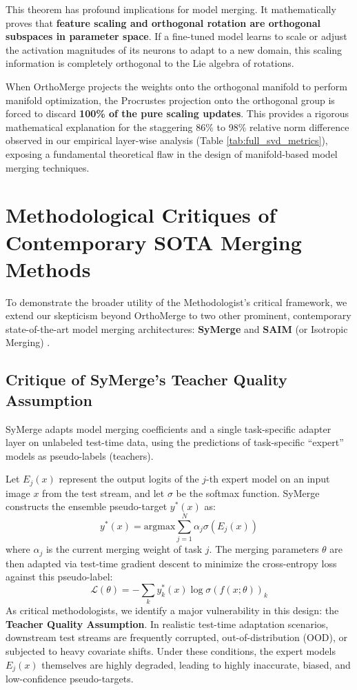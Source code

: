 \documentclass{article}
\begin{document}
This theorem has profound implications for model merging. It mathematically proves that \textbf{feature scaling and orthogonal rotation are orthogonal subspaces in parameter space}. If a fine-tuned model learns to scale or adjust the activation magnitudes of its neurons to adapt to a new domain, this scaling information is completely orthogonal to the Lie algebra of rotations. 

When OrthoMerge projects the weights onto the orthogonal manifold to perform manifold optimization, the Procrustes projection onto the orthogonal group is forced to discard \textbf{100\% of the pure scaling updates}. This provides a rigorous mathematical explanation for the staggering 86\% to 98\% relative norm difference observed in our empirical layer-wise analysis (Table \ref{tab:full_svd_metrics}), exposing a fundamental theoretical flaw in the design of manifold-based model merging techniques.

\section{Methodological Critiques of Contemporary SOTA Merging Methods}
\label{appendix:sota_critiques}
To demonstrate the broader utility of the Methodologist's critical framework, we extend our skepticism beyond OrthoMerge to two other prominent, contemporary state-of-the-art model merging architectures: \textbf{SyMerge} \cite{jung2024symerge} and \textbf{SAIM} (or Isotropic Merging) \cite{marczak2025isotropic}. 

\subsection{Critique of SyMerge's Teacher Quality Assumption}
SyMerge adapts model merging coefficients and a single task-specific adapter layer on unlabeled test-time data, using the predictions of task-specific ``expert'' models as pseudo-labels (teachers). 

Let $E_j(x)$ represent the output logits of the $j$-th expert model on an input image $x$ from the test stream, and let $\sigma$ be the softmax function. SyMerge constructs the ensemble pseudo-target $y^*(x)$ as:
\begin{equation}
    y^*(x) = \text{argmax} \sum_{j=1}^N \alpha_j \sigma\left(E_j(x)\right)
\end{equation}
where $\alpha_j$ is the current merging weight of task $j$. The merging parameters $\theta$ are then adapted via test-time gradient descent to minimize the cross-entropy loss against this pseudo-label:
\begin{equation}
    \mathcal{L}(\theta) = -\sum_{k} y^*_k(x) \log \sigma\left(f(x; \theta)\right)_k
\end{equation}
As critical methodologists, we identify a major vulnerability in this design: the \textbf{Teacher Quality Assumption}. In realistic test-time adaptation scenarios, downstream test streams are frequently corrupted, out-of-distribution (OOD), or subjected to heavy covariate shifts. Under these conditions, the expert models $E_j(x)$ themselves are highly degraded, leading to highly inaccurate, biased, and low-confidence pseudo-targets.
\end{document}
